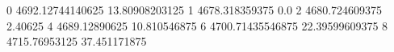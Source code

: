 0 4692.12744140625 13.80908203125
1 4678.318359375 0.0
2 4680.724609375 2.40625
4 4689.12890625 10.810546875
6 4700.71435546875 22.39599609375
8 4715.76953125 37.451171875
